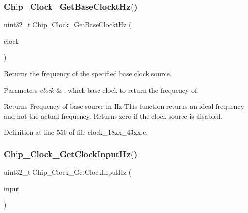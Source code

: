 \subsubsection{\texorpdfstring{Chip\+\_\+\+Clock\+\_\+\+Get\+Base\+Clockt\+Hz()}{Chip\_Clock\_GetBaseClocktHz()}}
{\footnotesize\ttfamily uint32\+\_\+t Chip\+\_\+\+Clock\+\_\+\+Get\+Base\+Clockt\+Hz (\begin{DoxyParamCaption}\item[{\hyperlink{chip__clocks_8h_a31e266dd83cc66eb866d8d051ffd1d45}{C\+H\+I\+P\+\_\+\+C\+G\+U\+\_\+\+B\+A\+S\+E\+\_\+\+C\+L\+K\+\_\+T}}]{clock }\end{DoxyParamCaption})}



Returns the frequency of the specified base clock source. 


\begin{DoxyParams}{Parameters}
{\em clock} & \+: which base clock to return the frequency of. \\
\hline
\end{DoxyParams}
\begin{DoxyReturn}{Returns}
Frequency of base source in Hz This function returns an ideal frequency and not the actual frequency. Returns zero if the clock source is disabled. 
\end{DoxyReturn}


Definition at line 550 of file clock\+\_\+18xx\+\_\+43xx.\+c.

\mbox{\label{group___c_l_o_c_k__18_x_x__43_x_x_ga4ad0a2b922ac85f94ab0bb2036def308}} 
\subsubsection{\texorpdfstring{Chip\+\_\+\+Clock\+\_\+\+Get\+Clock\+Input\+Hz()}{Chip\_Clock\_GetClockInputHz()}}
{\footnotesize\ttfamily uint32\+\_\+t Chip\+\_\+\+Clock\+\_\+\+Get\+Clock\+Input\+Hz (\begin{DoxyParamCaption}\item[{\hyperlink{group___c_l_o_c_k__18_x_x__43_x_x_ga0975326707efebf2b074283e6c602f18}{C\+H\+I\+P\+\_\+\+C\+G\+U\+\_\+\+C\+L\+K\+I\+N\+\_\+T}}]{input }\end{DoxyParamCaption})}




